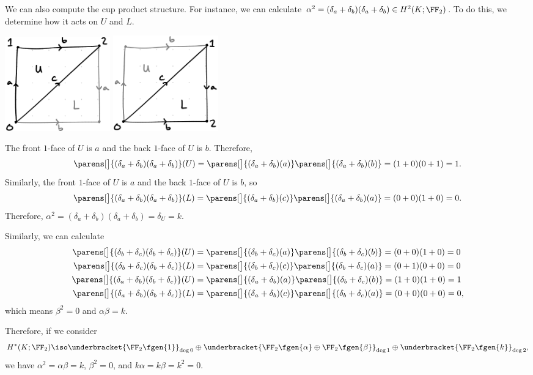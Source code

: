\documentclass{standalone}
\begin{document}
We can also compute the cup product structure.
For instance, we can calculate
\(\alpha^2 = (\delta_a + \delta_b)(\delta_a + \delta_b) \in H^2(K; \FF_2)\).
To do this, we determine how it acts on \(U\) and \(L\).
\begin{center}
  \includegraphics[width=0.2\textwidth]{18_905-201109-2.png}
  \qquad
  \includegraphics[width=0.2\textwidth]{18_905-201109-3.png}
\end{center}
The front \(1\)-face of \(U\) is \(a\) and
the back \(1\)-face of \(U\) is \(b\).
Therefore,
\[
  \parens[\big]{(\delta_a + \delta_b)(\delta_a + \delta_b)}(U)
    = \parens[\big]{(\delta_a + \delta_b)(a)}
      \parens[\big]{(\delta_a + \delta_b)(b)}
    = (1 + 0)(0 + 1) = 1.
\]
Similarly, the front \(1\)-face of \(U\) is \(a\) and
           the back \(1\)-face of \(U\) is \(b\), so
\[
  \parens[\big]{(\delta_a + \delta_b)(\delta_a + \delta_b)}(L)
    = \parens[\big]{(\delta_a + \delta_b)(c)}
      \parens[\big]{(\delta_a + \delta_b)(a)}
    = (0 + 0)(1 + 0) = 0.
\]
Therefore,
\(\alpha^2 = (\delta_a + \delta_b)(\delta_a + \delta_b) = \delta_U = k\).

Similarly, we can calculate
\begin{align*}
  \parens[\big]{(\delta_b + \delta_c)(\delta_b + \delta_c)}(U)
    &= \parens[\big]{(\delta_b + \delta_c)(a)}
       \parens[\big]{(\delta_b + \delta_c)(b)}
    = (0 + 0)(1 + 0) = 0 \\
  \parens[\big]{(\delta_b + \delta_c)(\delta_b + \delta_c)}(L)
    &= \parens[\big]{(\delta_b + \delta_c)(c)}
       \parens[\big]{(\delta_b + \delta_c)(a)}
    = (0 + 1)(0 + 0) = 0 \\
  \parens[\big]{(\delta_a + \delta_b)(\delta_b + \delta_c)}(U)
    &= \parens[\big]{(\delta_a + \delta_b)(a)}
       \parens[\big]{(\delta_b + \delta_c)(b)}
    = (1 + 0)(1 + 0) = 1 \\
  \parens[\big]{(\delta_a + \delta_b)(\delta_b + \delta_c)}(L)
    &= \parens[\big]{(\delta_a + \delta_b)(c)}
       \parens[\big]{(\delta_b + \delta_c)(a)}
    = (0 + 0)(0 + 0) = 0,
\end{align*}
which means \(\beta^2 = 0\) and \(\alpha\beta = k\).

Therefore, if we consider
\[
  H^*(K; \FF_2)
    \iso \underbracket{\FF_2\fgen{1}}_{\deg 0} \oplus
         \underbracket{\FF_2\fgen{\alpha}
                \oplus \FF_2\fgen{\beta}}_{\deg 1} \oplus
         \underbracket{\FF_2\fgen{k}}_{\deg 2},
\]
we have \(\alpha^2 = \alpha \beta = k\),
        \(\beta^2 = 0\), and
        \(k\alpha = k \beta = k^2 = 0\).
 
\end{document}
